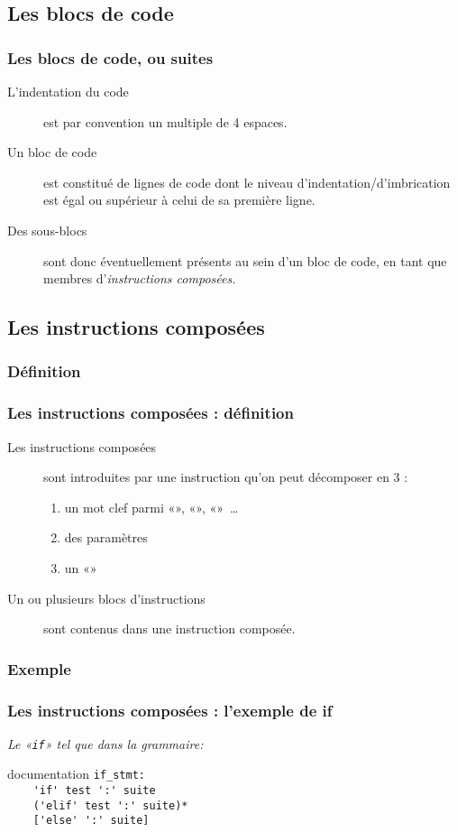 \subsection{Les blocs de code}
\begin{frame}[fragile]
  \frametitle{Les blocs de code, ou suites}
  \begin{description}
  \item[L'indentation du code] est par convention un multiple de 4 espaces. \pause
  \item[Un bloc de code] est constitué de lignes de code dont le niveau d'indentation/d'imbrication est égal ou supérieur à celui de sa première ligne. \pause
  \item[Des sous-blocs] sont donc éventuellement présents au sein d'un bloc de code, en tant que membres d'\em{instructions composées}.
  \end{description}
\end{frame}

\subsection{Les instructions composées}
\subsubsection{Définition}
\begin{frame}[fragile]
  \frametitle{Les instructions composées : définition}
  \begin{description}
  \item[Les instructions composées] sont introduites par une instruction qu'on peut décomposer en 3 : \pause
  \begin{enumerate}
      \item un mot clef parmi «», «», «»~\ldots \pause
      \item des paramètres \pause
      \item un «\hlcmd{:}» \pause
  \end{enumerate}
  \item[Un ou plusieurs blocs d'instructions] sont contenus dans une instruction composée.
  \end{description}
\end{frame}

\subsubsection{Exemple}
\begin{frame}[fragile]
  \frametitle{Les instructions composées : l'exemple de if}
  \emph{Le «\texttt{if}» tel que dans la grammaire:}\\
  \begin{beamercolorbox}{documentation}
  \small{\verb|if_stmt:|} \\
  \small{\verb|    'if' test ':' suite|} \\
  \small{\verb|    ('elif' test ':' suite)*|} \\
  \small{\verb|    ['else' ':' suite]|}
  \end{beamercolorbox}
\end{frame}

